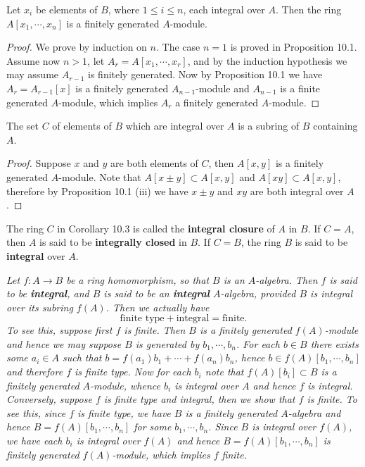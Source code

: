 \begin{corollary}
Let $x_i$ be elements of $B$, where $1\le i\le n$, each integral over $A$. Then the ring $A[x_1,\cdots,x_n]$ is a finitely generated $A$-module.
\end{corollary}
\begin{proof}
We prove by induction on $n$. The case $n=1$ is proved in Proposition 10.1. Assume now $n>1$, let $A_r=A[x_1,\cdots,x_r]$, and by the induction hypothesis we may assume $A_{r-1}$ is finitely generated. Now by Proposition 10.1 we have $A_r=A_{r-1}[x]$ is a finitely generated $A_{n-1}$-module and $A_{n-1}$ is a finite generated $A$-module, which implies $A_r$ a finitely generated $A$-module.
\end{proof}
\begin{corollary}
The set $C$ of elements of $B$ which are integral over $A$ is a subring of $B$ containing $A$.
\end{corollary}
\begin{proof}
Suppose $x$ and $y$ are both elements of $C$, then $A[x,y]$ is a finitely generated $A$-module. Note that $A[x\pm y]\subset A[x,y]$ and $A[xy]\subset A[x,y]$, therefore by Proposition 10.1 (iii) we have $x\pm y$ and $xy$ are both integral over $A$.
\end{proof}
The ring $C$ in Corollary 10.3 is called the \textbf{integral closure} of $A$ in $B$. If $C=A$, then $A$ is said to be \textbf{integrally closed} in $B$. If $C=B$, the ring $B$ is said to be \textbf{integral} over $A$.
\begin{note}\em
Let $f:A\to B$ be a ring homomorphism, so that $B$ is an $A$-algebra. Then $f$ is said to be \textbf{integral}, and $B$ is said to be an \textbf{integral} $A$-algebra, provided $B$ is integral over its subring $f(A)$. Then we actually have 
$$\text{finite type}+\text{integral}=\text{finite}.$$
To see this, suppose first $f$ is finite. Then $B$ is a finitely generated $f(A)$-module and hence we may suppose $B$ is generated by $b_1,\cdots,b_n$. For each $b\in B$ there exists some $a_i\in A$ such that $b=f(a_1)b_1+\cdots+f(a_n)b_n$, hence $b\in f(A)[b_1,\cdots,b_n]$ and therefore $f$ is finite type. Now for each $b_i$ note that $f(A)[b_i]\subset B$ is a finitely generated $A$-module, whence $b_i$ is integral over $A$ and hence $f$ is integral. Conversely, suppose $f$ is finite type and integral, then we show that $f$ is finite. To see this, since $f$ is finite type, we have $B$ is a finitely generated $A$-algebra and hence $B=f(A)[b_1,\cdots,b_n]$ for some $b_1,\cdots,b_n$. Since $B$ is integral over $f(A)$, we have each $b_i$ is integral over $f(A)$ and hence $B=f(A)[b_1,\cdots,b_n]$ is finitely generated $f(A)$-module, which implies $f$ finite.
\end{note}
